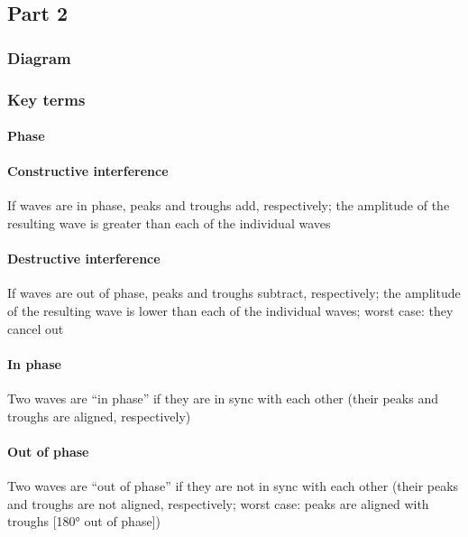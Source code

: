 \documentclass[pagesize,headsepline,10pt,parskip=half]{scrreprt}
\begin{document}
      \subsection{Part 2}
        \subsubsection{Diagram}
        \subsubsection{Key terms}
          \paragraph{Phase}
          \paragraph{Constructive interference}
            If waves are in phase, peaks and troughs add, respectively;
            the amplitude of the resulting wave is greater than each of the individual waves
          \paragraph{Destructive interference}
          If waves are out of phase, peaks and troughs subtract, respectively;
          the amplitude of the resulting wave is lower than each of the individual waves;
          worst case: they cancel out
          \paragraph{In phase}
            Two waves are “in phase” if they are in sync with each other
            (their peaks and troughs are aligned, respectively)
          \paragraph{Out of phase}
            Two waves are “out of phase” if they are not in sync with each other
            (their peaks and troughs are not aligned, respectively; worst case:
            peaks are aligned with troughs [180° out of phase])
\end{document}
